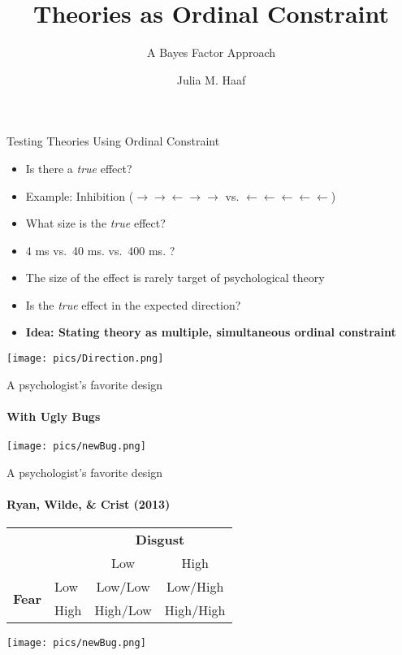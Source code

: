 \documentclass[ignorenonframetext,t]{beamer}
\title{Theories as Ordinal Constraint}
\subtitle{A Bayes Factor Approach}
\author{Julia M. Haaf}
\date{}
\providecommand{\tightlist}{%
  \setlength{\itemsep}{0pt}\setlength{\parskip}{0pt}}
\begin{document}
\frame{\titlepage}

\begin{frame}{Testing Theories Using Ordinal Constraint}

\vspace*{1cm}

\begin{itemize}[<+->]
\tightlist
\item
  Is there a \emph{true} effect?
\item
  Example: Inhibition
  (\(\rightarrow \rightarrow \boldsymbol{\leftarrow} \rightarrow \rightarrow\)
  vs.
  \(\leftarrow \leftarrow \boldsymbol{\leftarrow} \leftarrow \leftarrow\))
\item
  What size is the \emph{true} effect?
\item
  4 ms vs.~40 ms. vs.~400 ms. ?
\item
  The size of the effect is rarely target of psychological theory
\item
  Is the \emph{true} effect in the expected direction?
\item
  \textbf{Idea: Stating theory as multiple, simultaneous ordinal
  constraint}
\end{itemize}

\vspace*{.5cm}

\centering \texttt{[image: pics/Direction.png]}

\end{frame}

\begin{frame}{A psychologist's favorite design}

\framesubtitle{With Ugly Bugs}

\vspace*{.5cm}

\centering \texttt{[image: pics/newBug.png]}

\end{frame}

\begin{frame}{A psychologist's favorite design}

\framesubtitle{Ryan, Wilde, \& Crist (2013)}

\vspace*{1cm}

\centering

\begin{tabular}{llcc}
\hline
& & \multicolumn{2}{c}{\bf{Disgust}} \\ \cline{2-4}
& & Low & High\\ \hline
\multirow{2}{*}{\bf{Fear}} & Low & Low/Low & Low/High \\
& High & High/Low & High/High    \\ \hline
\end{tabular}

\vspace*{1.8cm}

\centering \texttt{[image: pics/newBug.png]}

\end{frame}
\end{document}
